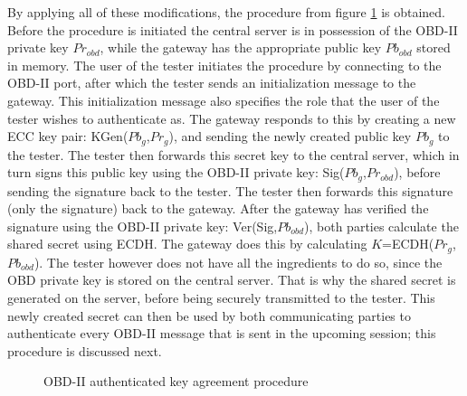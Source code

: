 By applying all of these modifications, the procedure from figure \ref{fig:authentication_procedure} is obtained. Before the procedure is initiated the central server is in possession of the OBD-II private key $Pr_{obd}$, while the gateway has the appropriate public key $Pb_{obd}$ stored in memory. The user of the tester initiates the procedure by connecting to the OBD-II port, after which the tester sends an initialization message to the gateway. This initialization message also specifies the role that the user of the tester wishes to authenticate as. The gateway responds to this by creating a new ECC key pair: KGen($Pb_g$,$Pr_g$), and sending the newly created public key $Pb_g$ to the tester. The tester then forwards this secret key to the central server, which in turn signs this public key using the OBD-II private key: Sig($Pb_g$,$Pr_{obd}$), before sending the signature back to the tester. The tester then forwards this signature (only the signature) back to the gateway. After the gateway has verified the signature using the OBD-II private key: Ver(Sig,$Pb_{obd}$), both parties calculate the shared secret using ECDH. The gateway does this by calculating $K$=ECDH($Pr_g$,$Pb_{obd}$). The tester however does not have all the ingredients to do so, since the OBD private key is stored on the central server. That is why the shared secret is generated on the server, before being securely transmitted to the tester. This newly created secret can then be used by both communicating parties to authenticate every OBD-II message that is sent in the upcoming session; this procedure is discussed next.
 
\begin{figure}[h]
	\centering
	\caption{OBD-II authenticated key agreement procedure}
	\label{fig:authentication_procedure}
\end{figure}

